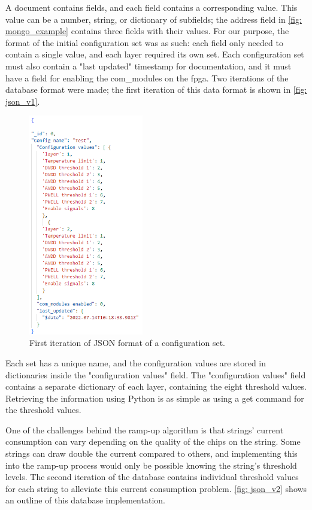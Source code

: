 \documentclass[main.tex]{subfiles}
\begin{document}
A document contains fields, and each field contains a corresponding value. This value can be a number, string, or dictionary of subfields; the address field in \autoref{fig: mongo_example} contains three fields with their values. For our purpose, the format of the initial configuration set was as such: each field only needed to contain a single value, and each layer required its own set. Each configuration set must also contain a "last updated" timestamp for documentation, and it must have a field for enabling the com\_modules on the \gls{fpga}. Two iterations of the database format were made; the first iteration of this data format is shown in \autoref{fig: json_v1}.

\begin{figure}[!ht]
    \centering
    \includegraphics[width=5cm, scale=1]{images/JSON_example_v1.png}
    \caption{First iteration of JSON format of a configuration set.}
    \label{fig: json_v1}
\end{figure}
\FloatBarrier

Each set has a unique name, and the configuration values are stored in dictionaries inside the "configuration values" field. The "configuration values" field contains a separate dictionary of each layer, containing the eight threshold values. Retrieving the information using Python is as simple as using a get command for the threshold values.

One of the challenges behind the ramp-up algorithm is that strings' current consumption can vary depending on the quality of the chips on the string. Some strings can draw double the current compared to others, and implementing this into the ramp-up process would only be possible knowing the string's threshold levels. The second iteration of the database contains individual threshold values for each string to alleviate this current consumption problem. \autoref{fig: json_v2} shows an outline of this database implementation.
\end{document}
